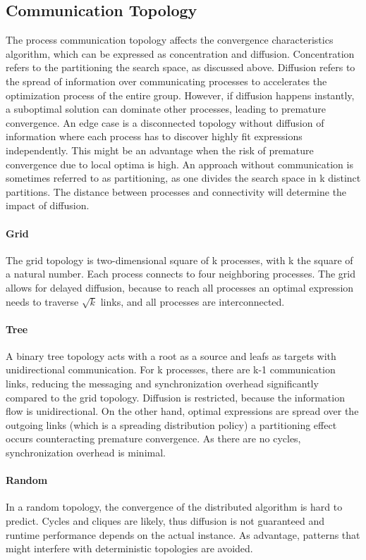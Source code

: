 \subsection{Communication Topology}
The process communication topology affects the convergence characteristics algorithm, which can be expressed as concentration and diffusion.
Concentration refers to the partitioning the search space, as discussed above. Diffusion refers to the spread of information over communicating processes to accelerates the optimization process of the entire group. However, if diffusion happens instantly, a suboptimal solution can dominate other processes, leading to premature convergence.  An edge case is a disconnected topology without diffusion of information where each process has to discover highly fit expressions independently. This might be an advantage when the risk of premature convergence due to local optima is high. An approach without communication is sometimes referred to as partitioning, as one divides the search space in k distinct partitions.
The distance between processes and connectivity will determine the impact of diffusion.

\paragraph{Grid}
The grid topology is two-dimensional square of k processes, with k the square of a natural number. Each process connects to four neighboring processes. The grid allows for delayed diffusion, because to reach all processes an optimal expression needs to traverse $\sqrt{k}$ links, and all processes are interconnected.

\paragraph{Tree}
A binary tree topology acts with a root as a source and leafs as targets with unidirectional communication. For k processes, there are k-1 communication links, reducing the messaging and synchronization overhead significantly compared to the grid topology. Diffusion is restricted, because the information flow is unidirectional. On the other hand, optimal expressions are spread over the outgoing links (which is a spreading distribution policy) a partitioning effect occurs counteracting premature convergence. As there are no cycles, synchronization overhead is minimal.

\paragraph{Random}
In a random topology, the convergence of the distributed algorithm is hard to predict. Cycles and cliques are likely, thus diffusion is not guaranteed and runtime performance depends on the actual instance. As advantage, patterns that might interfere with deterministic topologies are avoided.
